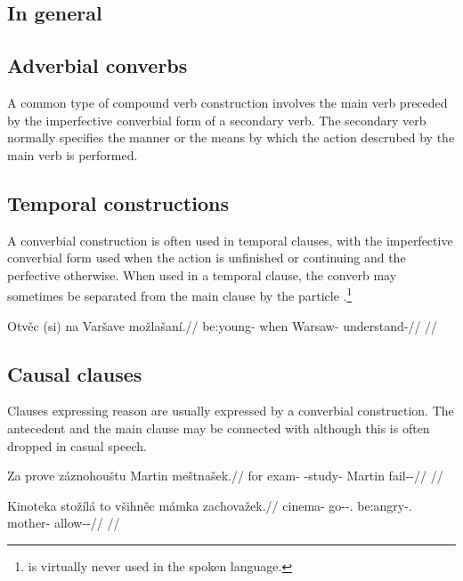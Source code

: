 \subsection{In general}

\subsection{Adverbial converbs}

A common type of compound verb construction involves the main verb preceded by the imperfective converbial form of a secondary verb. The secondary verb normally specifies the manner or the means by which the action descrubed by the main verb is performed.


\subsection{Temporal constructions}

A converbial construction is often used in temporal clauses, with the imperfective converbial form used when the action is unfinished or continuing and the perfective otherwise. When used in a temporal clause, the converb may sometimes be separated from the main clause by the particle .\footnote{ is virtually never used in the spoken language.}

\pex
\begingl
\gla Otvěc (si) na Varšave možlašaní.//
\glb be:young- when \Loc{} Warsaw-\Acc{} understand-//
\glft {}//
\endgl
\xe

\subsection{Causal clauses}

Clauses expressing reason are usually expressed by a converbial construction. The antecedent and the main clause may be connected with  although this is often dropped in casual speech.

\pex
\begingl
\gla Za prove záznohouštu Martin meštnašek.//
\glb for exam-\Acc{} \Neg{}-study- Martin fail-\Av{}-\Pf{}//
\glft {}//
\endgl
\xe


\pex
\begingl
\gla Kinoteka stožílá to všihněc mámka zachovažek.//
\glb cinema-\Acc{} go-\Av{}-\Sbj{}.\Ipf{} \Rz{} be:angry-\Cv{}.\Ipf{} mother-\Dim{} allow-\Av{}-\Pf{}//
\glft {}//
\endgl
\xe


